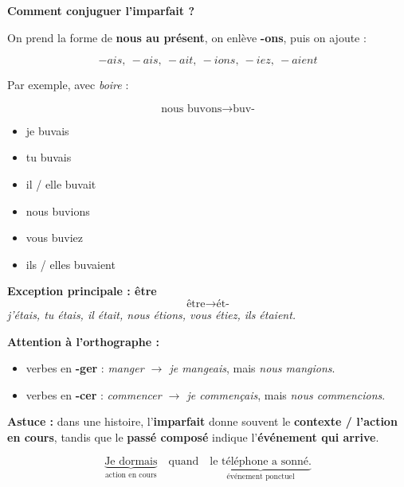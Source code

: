 \documentclass[math,code]{amznotes}
\theoremstyle{remark}
\begin{document}
\begin{enumerate}
    \begin{notebox}
    \textbf{Comment conjuguer l'imparfait ?}
    
    On prend la forme de \textbf{nous au présent}, on enlève \textbf{-ons},
    puis on ajoute :
    
    \[
    \boxed{-ais,\ -ais,\ -ait,\ -ions,\ -iez,\ -aient}
    \]
    
    Par exemple, avec \textit{boire} :
    
    \[
    \text{nous buvons} \rightarrow \text{buv-}
    \]
    
    \begin{itemize}
        \item je buvais
        \item tu buvais
        \item il / elle buvait
        \item nous buvions
        \item vous buviez
        \item ils / elles buvaient
    \end{itemize}
    
    \textbf{Exception principale : être}
    \[
    \text{être} \rightarrow \text{ét-}
    \]
    \textit{j'étais, tu étais, il était, nous étions, vous étiez, ils étaient.}
    
    \textbf{Attention à l'orthographe :}
    \begin{itemize}
        \item verbes en \textbf{-ger} : \textit{manger $\rightarrow$ je mangeais},
        mais \textit{nous mangions}.
        \item verbes en \textbf{-cer} : \textit{commencer $\rightarrow$ je commençais},
        mais \textit{nous commencions}.
    \end{itemize}
    \end{notebox}
    
    \begin{notebox}
    \textbf{Astuce :} dans une histoire, l'\textbf{imparfait} donne souvent
    le \textbf{contexte / l'action en cours}, tandis que le \textbf{passé composé}
    indique l'\textbf{événement qui arrive}.
    
    \[
    \underbrace{\text{Je dormais}}_{\text{action en cours}}
    \quad\text{quand}\quad
    \underbrace{\text{le téléphone a sonné.}}_{\text{événement ponctuel}}
    \]
    \end{notebox}
\end{enumerate}
\end{document}
